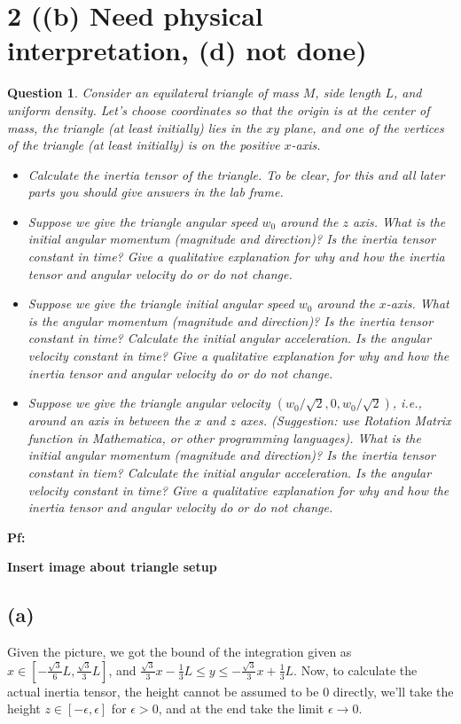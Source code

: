 \documentclass{article}
\newtheorem{question}{Question}
\begin{document}
\section*{2 ((b) Need physical interpretation, (d) not done)}
\begin{question}\label{q2}
    Consider an equilateral triangle of mass $M$, side length $L$, and uniform density. Let's choose coordinates so that the origin is at the center of mass, the triangle (at least initially) lies in the $xy$ plane, and one of the vertices of the triangle (at least initially) is on the positive $x$-axis.
    \begin{itemize}
        \item[(a)] Calculate the inertia tensor of the triangle. To be clear, for this and all later parts you should give answers in the lab frame.
        \item[(b)] Suppose we give the triangle angular speed $w_0$ around the $z$ axis. What is the initial angular momentum (magnitude and direction)? Is the inertia tensor constant in time? Give a qualitative explanation for why and how the inertia tensor and angular velocity do or do not change.
        \item[(c)] Suppose we give the triangle initial angular speed $w_0$ around the $x$-axis. What is the angular momentum (magnitude and direction)? Is the inertia tensor constant in time? Calculate the initial angular acceleration. Is the angular velocity constant in time? Give a qualitative explanation for why and how the inertia tensor and angular velocity do or do not change.
        \item[(d)] Suppose we give the triangle angular velocity $(w_0/\sqrt{2},0,w_0/\sqrt{2})$, i.e., around an axis in between the $x$ and $z$ axes. (Suggestion: use Rotation Matrix function in Mathematica, or other programming languages). What is the initial angular momentum (magnitude and direction)? Is the inertia tensor constant in tiem? Calculate the initial angular acceleration. Is the angular velocity constant in time? Give a qualitative explanation for why and how the inertia tensor and angular velocity do or do not change. 
    \end{itemize}
\end{question}

\textbf{Pf:}

\textbf{Insert image about triangle setup}

\subsection*{(a)}
Given the picture, we got the bound of the integration given as $x\in [-\frac{\sqrt{3}}{6}L, \frac{\sqrt{3}}{3}L]$, and $\frac{\sqrt{3}}{3}x-\frac{1}{3}L\leq y\leq -\frac{\sqrt{3}}{3}x+\frac{1}{3}L$. Now, to calculate the actual inertia tensor,  the height cannot be assumed to be $0$ directly, we'll take the height $z\in [-\epsilon,\epsilon]$ for $\epsilon>0$, and at the end take the limit $\epsilon\rightarrow 0$. 
\end{document}
